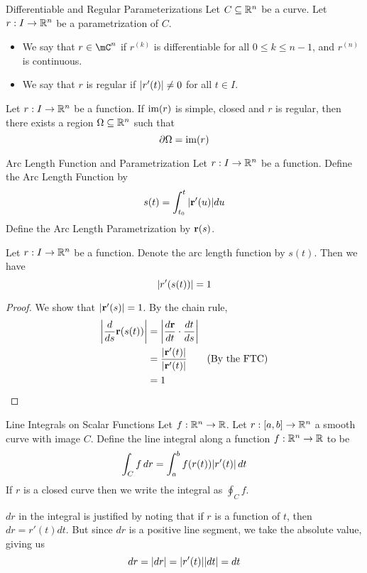 \documentclass[a4paper]{article}
\begin{document}
\begin{defn}{Differentiable and Regular Parameterizations}{} Let $C\subseteq\mathbb{R}^n$ be a curve. Let $r:I\to\mathbb{R}^n$ be a parametrization of $C$. 
\begin{itemize}
\item We say that $r\in\mC^n$ if $r^{(k)}$ is differentiable for all $0\leq k\leq n-1$, and $r^{(n)}$ is continuous. 
\item We say that $r$ is regular if $\abs{r'(t)}\neq 0$ for all $t\in I$. 
\end{itemize}
\end{defn}

\begin{prp}{}{} Let $r:I\to\mathbb{R}^n$ be a function. If $\operatorname{im}(r)$ is simple, closed and $r$ is regular, then there exists a region $\Omega\subseteq\mathbb{R}^n$ such that $$\partial\Omega=\operatorname{im}(r)$$
\end{prp}

\begin{defn}{Arc Length Function and Parametrization}{} Let $r:I\to\mathbb{R}^n$ be a function. Define the Arc Length Function by $$s(t)=\int_{t_0}^{t}\abs{\vb{r}'(u)}du$$ Define the Arc Length Parametrization by $\vb{r}(s)$. 
\end{defn}

\begin{lmm}{}{} Let $r:I\to\mathbb{R}^n$ be a function. Denote the arc length function by $s(t)$. Then we have $$\abs{r'(s(t))}=1$$ 
\begin{proof} We show that $\abs{\vb{r}'(s)}=1$. By the chain rule, 
\begin{align*}
\abs{\frac{d}{ds}\vb{r}(s(t))}&=\abs{\frac{d\vb{r}}{dt}\cdot\frac{dt}{ds}}\\
&=\frac{\abs{\vb{r}'(t)}}{\abs{\vb{r}'(t)}}\tag{By the FTC}\\
&=1
\end{align*}
\end{proof}
\end{lmm}

\begin{defn}{Line Integrals on Scalar Functions}{} Let $f:\mathbb{R}^n\to\mathbb{R}$. Let $r:[a,b]\to\mathbb{R}^n$ a smooth curve with image $C$. Define the line integral along a function $f:\mathbb{R}^n\to\mathbb{R}$ to be $$\int_Cf\,dr=\int_a^bf(r(t))\abs{r'(t)}\,dt$$ If $r$ is a closed curve then we write the integral as $\oint_Cf$. 
\end{defn}

$dr$ in the integral is justified by noting that if $r$ is a function of $t$, then $dr=r'(t)dt$. But since $dr$ is a positive line segment, we take the absolute value, giving us $$dr=\abs{dr}=\abs{r'(t)}\abs{dt}=dt$$
\end{document}
